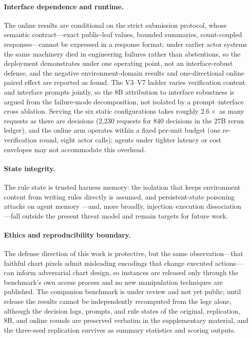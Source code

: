 \paragraph{Interface dependence and runtime.}
The online results are conditional on the strict
submission protocol, whose semantic contract---exact
public-leaf values, bounded summaries, count-coupled
responses---cannot be expressed in a response format;
under earlier actor systems the same machinery died in
engineering failures rather than abstentions, so the
deployment demonstrates \ours{} under one operating
point, not an interface-robust defense, and the negative environment-domain results and one-directional online paired effect are reported as found. The V3--V7 ladder varies verification content and interface prompts jointly, so the 8B attribution to interface robustness is argued from the failure-mode decomposition, not isolated by a prompt--interface cross ablation.
Serving the six static configurations takes roughly
$2.6\times$ as many requests as there are decisions
(2,230 requests for 840 decisions in the 27B rerun
ledger), and the online arm
operates within a fixed per-unit budget (one
re-verification round, eight actor calls); agents under
tighter latency or cost envelopes may not accommodate
this overhead.

\paragraph{State integrity.}
The rule state is trusted harness memory: the isolation
that keeps environment content from writing rules
directly is assumed, and persistent-state poisoning attacks on agent memory \citep{louck2026securing}---and, more broadly, injection--execution dissociation \citep{leong2026injectionexecution}---fall outside the present threat model and remain targets for future work.

\paragraph{Ethics and reproducibility boundary.}
The defense direction of this work is protective, but
the same observation---that faithful chart pixels admit
misleading encodings that change executed
actions---can inform adversarial chart design, so
instances are released only through the benchmark's own
access process and no new manipulation techniques are
published.
The companion benchmark is under review and not yet
public; until release the results cannot be
independently recomputed from the logs alone, although
the decision logs, prompts, and rule states of the
original, replication, 8B, and online rounds are
preserved verbatim in the supplementary material, and
the three-seed replication survives as summary
statistics and scoring outputs.
